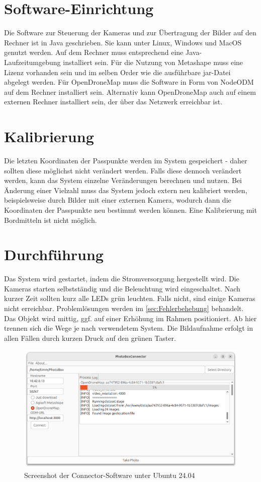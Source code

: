 \documentclass[./00PhotoBox.tex]{subfiles}
\begin{document}
\section{Software-Einrichtung}
\label{sec:SoftwareEinrichtung}
Die Software zur Steuerung der Kameras und zur Übertragung der Bilder auf den Rechner ist in Java geschrieben. Sie kann unter Linux, Windows und MacOS genutzt werden. Auf dem Rechner muss entsprechend eine Java-Laufzeitumgebung installiert sein. Für die Nutzung von Metashape muss eine Lizenz vorhanden sein und im selben Order wie die ausführbare jar-Datei abgelegt werden. Für OpenDroneMap muss die Software in Form von NodeODM auf dem Rechner installiert sein. Alternativ kann OpenDroneMap auch auf einem externen Rechner installiert sein, der über das Netzwerk erreichbar ist.

\section{Kalibrierung}
Die letzten Koordinaten der Passpunkte werden im System gespeichert - daher sollten diese möglichst nicht verändert werden. Falls diese dennoch verändert werden, kann das System einzelne Veränderungen berechnen und nutzen. Bei Änderung einer Vielzahl muss das System jedoch extern neu kalibriert werden, beispielsweise durch Bilder mit einer externen Kamera, wodurch dann die Koordinaten der Passpunkte neu bestimmt werden können. Eine Kalibrierung mit Bordmitteln ist nicht möglich.

\section{Durchführung}
Das System wird gestartet, indem die Stromversorgung hergestellt wird. Die Kameras starten selbstständig und die Beleuchtung wird eingeschaltet. Nach kurzer Zeit sollten kurz alle LEDs grün leuchten. Falls nicht, sind einige Kameras nicht erreichbar. Problemlösungen werden im \autoref{sec:Fehlerbehebung} behandelt.
Das Objekt wird mittig, ggf. auf einer Erhöhung im Rahmen positioniert.
Ab hier trennen sich die Wege je nach verwendetem System. Die Bildaufnahme erfolgt in allen Fällen durch kurzen Druck auf den grünen Taster.

\begin{figure}
    \centering
    \includegraphics[width=1\textwidth]{./img/connector_screenshot.png}
    \caption{Screenshot der Connector-Software unter Ubuntu 24.04} %
    \label{img:connector} %
\end{figure}
\end{document}
